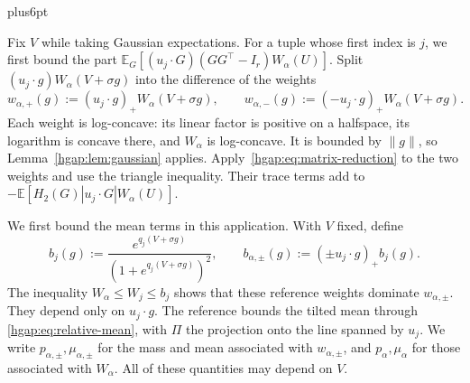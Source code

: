 \documentclass[11pt,letterpaper,twoside,leqno]{article}
\makeatletter
\theoremstyle{bookplain}
\theoremstyle{bookremark}
\renewenvironment{proof}[1][\proofname]{\par
  \pushQED{\qed}\normalfont\topsep6pt plus6pt\relax
  \trivlist\item[\hskip\labelsep\bfseries #1\@addpunct{.}]\ignorespaces
}{\popQED\endtrivlist\@endpefalse}
\newcommand{\E}{\mathbb E}
\makeatother
\begin{document}
\begin{proof}
Fix $V$ while taking Gaussian expectations. For a tuple whose first
index is $j$, we first bound the part
$\E_G[(u_j\cdot G)(GG^\top-I_r)W_\alpha(U)]$.
Split $(u_j\cdot g)W_\alpha(V+\sigma g)$ into the difference of the weights
\[
 w_{\alpha,+}(g):=(u_j\cdot g)_+W_\alpha(V+\sigma g),\qquad
 w_{\alpha,-}(g):=(-u_j\cdot g)_+W_\alpha(V+\sigma g).
\]
Each weight is log-concave: its linear factor is positive on a
halfspace, its logarithm is concave there, and $W_\alpha$ is log-concave.
It is bounded by $\|g\|$, so Lemma~\ref{hgap:lem:gaussian} applies.
Apply~\eqref{hgap:eq:matrix-reduction} to the two weights and use the
triangle inequality. Their trace terms add to
$-\E[H_2(G)|u_j\cdot G|W_\alpha(U)]$.

We first bound the mean terms in this application. With $V$ fixed,
define
\[
 b_j(g):=\frac{e^{q_j(V+\sigma g)}}{(1+e^{q_j(V+\sigma g)})^2},
 \qquad b_{\alpha,\pm}(g):=(\pm u_j\cdot g)_+b_j(g).
\]
The inequality $W_\alpha\le W_j\le b_j$ shows that these reference
weights dominate $w_{\alpha,\pm}$. They depend only on $u_j\cdot g$.
The reference bounds the tilted mean through
\eqref{hgap:eq:relative-mean}, with $\Pi$ the projection onto the line
spanned by $u_j$. We write $p_{\alpha,\pm},\mu_{\alpha,\pm}$ for the
mass and mean associated with $w_{\alpha,\pm}$, and
$p_\alpha,\mu_\alpha$ for those associated with $W_\alpha$.
All of these quantities may depend on $V$.


\end{proof}
\end{document}
